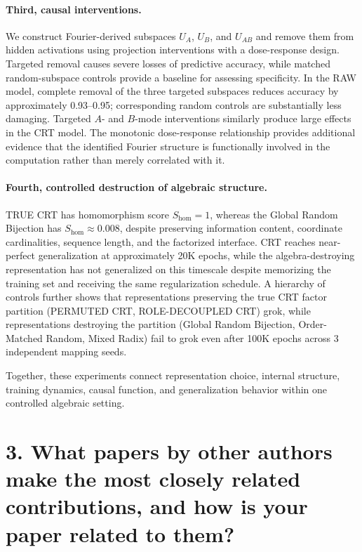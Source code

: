 \documentclass[9pt,a4paper]{extarticle}
\newcommand{\Shom}{S_{\mathrm{hom}}}
\begin{document}
\paragraph{Third, causal interventions.} We construct Fourier-derived subspaces $U_A$, $U_B$, and $U_{AB}$ and remove them from hidden activations using projection interventions with a dose-response design. Targeted removal causes severe losses of predictive accuracy, while matched random-subspace controls provide a baseline for assessing specificity. In the RAW model, complete removal of the three targeted subspaces reduces accuracy by approximately 0.93--0.95; corresponding random controls are substantially less damaging. Targeted $A$- and $B$-mode interventions similarly produce large effects in the CRT model. The monotonic dose-response relationship provides additional evidence that the identified Fourier structure is functionally involved in the computation rather than merely correlated with it.

\paragraph{Fourth, controlled destruction of algebraic structure.} TRUE CRT has homomorphism score $\Shom = 1$, whereas the Global Random Bijection has $\Shom \approx 0.008$, despite preserving information content, coordinate cardinalities, sequence length, and the factorized interface. CRT reaches near-perfect generalization at approximately 20K epochs, while the algebra-destroying representation has not generalized on this timescale despite memorizing the training set and receiving the same regularization schedule. A hierarchy of controls further shows that representations preserving the true CRT factor partition (PERMUTED CRT, ROLE-DECOUPLED CRT) grok, while representations destroying the partition (Global Random Bijection, Order-Matched Random, Mixed Radix) fail to grok even after 100K epochs across 3 independent mapping seeds.

Together, these experiments connect representation choice, internal structure, training dynamics, causal function, and generalization behavior within one controlled algebraic setting.

\section*{3. What papers by other authors make the most closely related contributions, and how is your paper related to them?}
\end{document}
